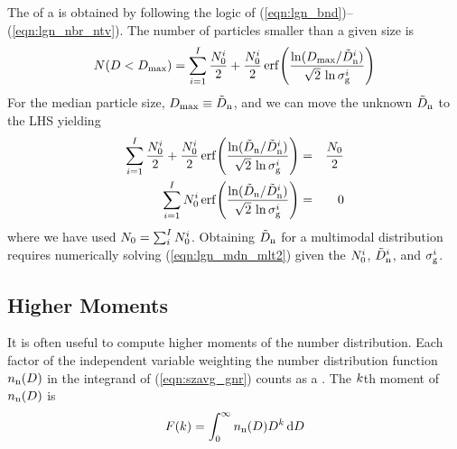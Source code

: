 \documentclass[12pt,twoside]{article}
\begin{document}
The  of a  is
obtained by following the logic of
(\ref{eqn:lgn_bnd})--(\ref{eqn:lgn_nbr_ntv}). 
The number of particles smaller than a given size is
\begin{equation}
N(D < D_{\mathrm{max}}) = \sum_{i = 1}^{I} 
\frac{N_{0}^{i}}{2} + 
\frac{N_{0}^{i}}{2} \, \mathrm{erf}\! \left( \frac{\ln (D_{\mathrm{max}} / \tilde{D}_{\mathrm{n}}^{i})}{\sqrt{2}\,\ln \sigma_{\mathrm{g}}^{i} } \right)
\label{eqn:lgn_mdn_mlt}
\end{equation}
For the median particle size, $D_{\mathrm{max}} \equiv \tilde{D}_{\mathrm{n}}$, and we can
move the unknown $\tilde{D}_{\mathrm{n}}$ to the LHS yielding
\begin{eqnarray}
\sum_{i = 1}^{I} \frac{N_{0}^{i}}{2} + 
\frac{N_{0}^{i}}{2} \, \mathrm{erf}\! \left( \frac{\ln (\tilde{D}_{\mathrm{n}} / \tilde{D}_{\mathrm{n}}^{i})
}{ \sqrt{2}\,\ln \sigma_{\mathrm{g}}^{i} } \right) 
& = & \frac{N_{0}}{2} \nonumber \\ 
\sum_{i = 1}^{I} 
N_{0}^{i} \, \mathrm{erf}\! \left( \frac{\ln (\tilde{D}_{\mathrm{n}} / \tilde{D}_{\mathrm{n}}^{i}) }{
\sqrt{2}\,\ln \sigma_{\mathrm{g}}^{i} } \right) & = & 0
\label{eqn:lgn_mdn_mlt2}
\end{eqnarray}
where we have used $N_{0} = \sum_i^I N_{0}^{i}$.
Obtaining $\tilde{D}_{\mathrm{n}}$ for a multimodal distribution requires 
numerically solving (\ref{eqn:lgn_mdn_mlt2}) given the $N_{0}^{i}$,
$\tilde{D}_{\mathrm{n}}^{i}$, and $\sigma_{\mathrm{g}}^{i}$.


\subsection[Higher Moments]{Higher Moments}\label{sxn:mmt}
It is often useful to compute higher moments of the number distribution.  
Each factor of the independent variable weighting the number
distribution function $n_{\mathrm{n}}(D)$ in the integrand of
(\ref{eqn:szavg_gnr}) counts as a . 
The $k$th moment of $n_{\mathrm{n}}(D)$ is 
\begin{equation}
F(k) = \int_{0}^{\infty} n_{\mathrm{n}}(D) D^k \,\mathrm{d}D
\label{eqn:dst_mmt_dfn}
\end{equation}
\end{document}
